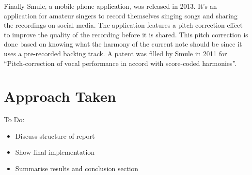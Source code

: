 Finally Smule, a mobile phone application, was released in 2013. It's an
application for amateur singers to record themselves singing songs and sharing the
recordings on social media. The application features a pitch correction effect to
improve the quality of the recording before it is shared. This pitch correction is
done based on knowing what the harmony of the current note should be since it uses
a pre-recorded backing track. A patent was filled by Smule in 2011 for
``Pitch-correction of vocal performance in accord with score-coded harmonies''.

\section{Approach Taken}

\color{red}
To Do:
\begin{itemize}
	\item Discuss structure of report
	\item Show final implementation
	\item Summarise results and conclusion section
\end{itemize}
\color{black}
